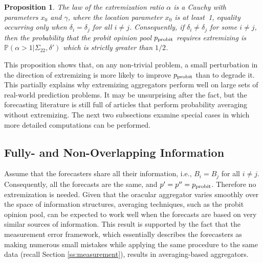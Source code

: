 \documentclass[11pt]{article}
\renewcommand{\P}{\mathbb{P}}
\newtheorem{proposition}[theorem]{Proposition}
\theoremstyle{definition}
\theoremstyle{definition}
\def\P{{\mathbb P}}
\def\probit{p_{\rm probit}}
\begin{document}
\begin{proposition}
\label{positiveProbThm}
The law of the extremization ratio $\alpha$ is a Cauchy with
parameters $x_0$ and $\gamma$, where the location parameter $x_0$ is
at least~1, equality occurring only when $\delta_i = \delta_j$ for all
$i \neq j$. Consequently, if $\delta_i \neq \delta_j$ for some
$i \neq j$, then the probability that the probit opinion pool $\probit$
requires extremizing is $\P\left(\alpha > 1 | \Sigma_{22}, \delta'\right)$ which
is strictly greater than $1/2$.
\end{proposition}
\noindent
This proposition shows that, on any non-trivial problem, a small
perturbation in the direction of extremizing is more likely to improve
$\probit$ than to degrade it.  This partially explains
why extremizing aggregators perform well on large sets of real-world
prediction problems.  It may be unsurprising after the fact, but the
forecasting literature is still full of articles that perform
probability averaging without extremizing. The next two subsections examine special cases in which more detailed computations can be performed.


\subsection{Fully- and Non-Overlapping Information}
\label{disjoint}
Assume that the forecasters share all their information, i.e.,  $B_{i} = B_j$ for all $i \neq j$. Consequently, all the forecasts are the same, and $p' = p'' = \probit$.
Therefore no
extremization is needed. Given that the oracular aggregator varies
smoothly over the space of information structures, averaging
techniques, such as the probit opinion pool, can be expected to work
well when the forecasts are based on very similar sources of
information. This result is supported by the fact that the
measurement error framework, which essentially describes the
forecasters as making numerous small mistakes while applying the same
procedure to the same data (recall Section \ref{ss:measurement}),
results in averaging-based aggregators.
\end{document}
